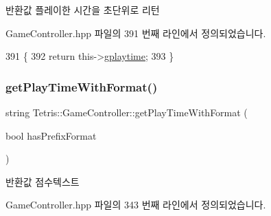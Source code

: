 \begin{DoxyReturn}{반환값}
플레이한 시간을 초단위로 리턴 
\end{DoxyReturn}


Game\+Controller.\+hpp 파일의 391 번째 라인에서 정의되었습니다.


\begin{DoxyCode}
391                                              \{
392             \textcolor{keywordflow}{return} this->\hyperlink{class_tetris_1_1_game_controller_a562adcade20e362160535cd7248a2cce}{gplaytime};
393         \}
\end{DoxyCode}
\mbox{\label{class_tetris_1_1_game_controller_a71765a7d8b76400832c98002a113ed26}} 
\subsubsection{\texorpdfstring{get\+Play\+Time\+With\+Format()}{getPlayTimeWithFormat()}}
{\footnotesize\ttfamily string Tetris\+::\+Game\+Controller\+::get\+Play\+Time\+With\+Format (\begin{DoxyParamCaption}\item[{bool}]{has\+Prefix\+Format }\end{DoxyParamCaption})\hspace{0.3cm}{\ttfamily [inline]}}

\begin{DoxyReturn}{반환값}
점수텍스트 
\end{DoxyReturn}


Game\+Controller.\+hpp 파일의 343 번째 라인에서 정의되었습니다.


